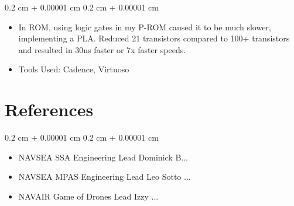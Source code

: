 \documentclass[10pt, letterpaper]{article}
\newenvironment{highlights}{
    \begin{itemize}[
        topsep=0.10 cm,
        parsep=0.10 cm,
        partopsep=0pt,
        itemsep=0pt,
        leftmargin=0.4 cm + 10pt
    ]
}{
    \end{itemize}
} %
\newenvironment{onecolentry}{
    \begin{adjustwidth}{
        0.2 cm + 0.00001 cm
    }{
        0.2 cm + 0.00001 cm
    }
}{
    \end{adjustwidth}
} %
\begin{document}
        \vspace{0.10 cm}
        \begin{onecolentry}
            \begin{highlights}
                \item In ROM, using logic gates in my P-ROM caused it to be much slower, implementing a PLA. Reduced 21 transistors compared to 100+ transistors and resulted in 30ns faster or 7x faster speeds.
                \item Tools Used: Cadence, Virtuoso
            \end{highlights}
        \end{onecolentry}


        \vspace{0.2 cm}

    \section{References}
        
        \begin{onecolentry}
            \begin{highlights}
                \item NAVSEA SSA Engineering Lead Dominick B... 
                \item NAVSEA MPAS Engineering Lead Leo Sotto ...
                \item NAVAIR Game of Drones Lead Izzy ...
            \end{highlights}
        \end{onecolentry}
        \vspace{0.2 cm}
\end{document}
